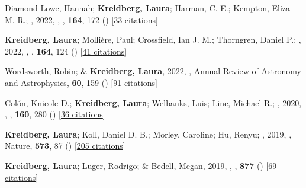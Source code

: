 \item[{\color{numcolor}\scriptsize20}] Diamond-Lowe, Hannah; \textbf{Kreidberg, Laura}; Harman, C. E.; Kempton, Eliza M.-R.; \etal, 2022, , \aj, \textbf{164}, 172 () [\href{https://ui.adsabs.harvard.edu/abs/2022AJ....164..172D}{33 citations}]

\item[{\color{numcolor}\scriptsize19}] \textbf{Kreidberg, Laura}; Molli{\`e}re, Paul; Crossfield, Ian J. M.; Thorngren, Daniel P.; \etal, 2022, , \aj, \textbf{164}, 124 () [\href{https://ui.adsabs.harvard.edu/abs/2022AJ....164..124K}{41 citations}]

\item[{\color{numcolor}\scriptsize18}] Wordsworth, Robin; \& \textbf{Kreidberg, Laura}, 2022, , Annual Review of Astronomy and Astrophysics, \textbf{60}, 159 () [\href{https://ui.adsabs.harvard.edu/abs/2022ARA&A..60..159W}{91 citations}]

\item[{\color{numcolor}\scriptsize17}] Col{\'o}n, Knicole D.; \textbf{Kreidberg, Laura}; Welbanks, Luis; Line, Michael R.; \etal, 2020, , \aj, \textbf{160}, 280 () [\href{https://ui.adsabs.harvard.edu/abs/2020AJ....160..280C}{36 citations}]

\item[{\color{numcolor}\scriptsize16}] \textbf{Kreidberg, Laura}; Koll, Daniel D. B.; Morley, Caroline; Hu, Renyu; \etal, 2019, , Nature, \textbf{573}, 87 () [\href{https://ui.adsabs.harvard.edu/abs/2019Natur.573...87K}{205 citations}]

\item[{\color{numcolor}\scriptsize15}] \textbf{Kreidberg, Laura}; Luger, Rodrigo; \& Bedell, Megan, 2019, , \apj, \textbf{877} () [\href{https://ui.adsabs.harvard.edu/abs/2019ApJ...877L..15K}{69 citations}]

